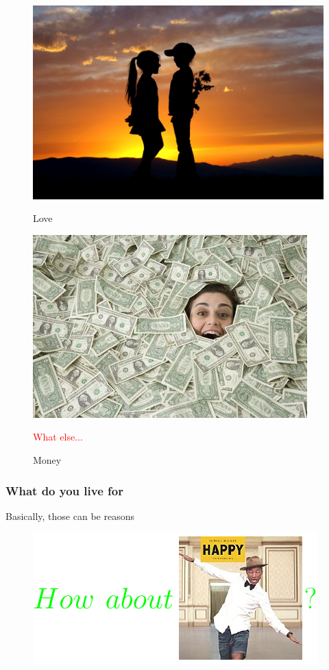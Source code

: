 \documentclass{beamer}
\begin{document}
\begin{frame}
\begin{figure}
\begin{minipage}{0.45\textwidth}
      \centering
      \includegraphics[width=.7\textwidth]{./img/love.jpg} 
      \caption{Love}
      \label{fig:sit-two}
    \end{minipage}\hfill
    \begin{minipage}{0.45\textwidth}
      \centering
      \includegraphics[width=.7\textwidth]{./img/money.jpg} 
      \caption{Money}
      \label{fig:sit-four}
    \end{minipage}
    

    \textcolor{red}{What else...}
  \end{figure}
\end{frame}
  
\begin{frame}
  \frametitle{What do you live for}
  \begin{center}
    \huge {Basically, those can be reasons}
  \end{center}
  \begin{figure}
    \includegraphics[scale=1.3]{./embed/whyHappy.pdf}
  \end{figure}
\end{frame}
\end{document}
